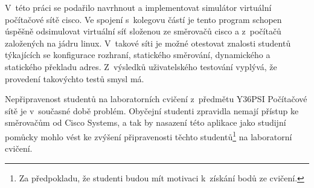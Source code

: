 \documentclass[11pt,twoside,a4paper]{book}
\begin{document}
V~této práci se podařilo navrhnout a implementovat simulátor virtuální počítačové sítě cisco. Ve spojení s~kolegovu částí je tento program schopen úspěšně odsimulovat virtuální síť složenou ze směrovačů cisco a z~počítačů založených na jádru linux. V~takové síti je možné otestovat znalosti studentů týkajících se konfigurace rozhraní, statického směrování, dynamického a statického překladu adres. Z~výsledků uživatelského testování vyplývá, že provedení takovýchto testů smysl má.

Nepřipravenost studentů na laboratorních cvičení z~předmětu Y36PSI Počítačové sítě je v~současné době problém. Obyčejní studenti zpravidla nemají přístup ke směrovačům od Cisco Systems, a tak by nasazení této aplikace jako studijní pomůcky mohlo vést ke zvýšení připravenosti těchto studentů\footnote{Za předpokladu, že studenti budou mít motivaci k~získání bodů ze cvičení.} na laboratorní cvičení. 

% 
% 
% 







%

\end{document}

